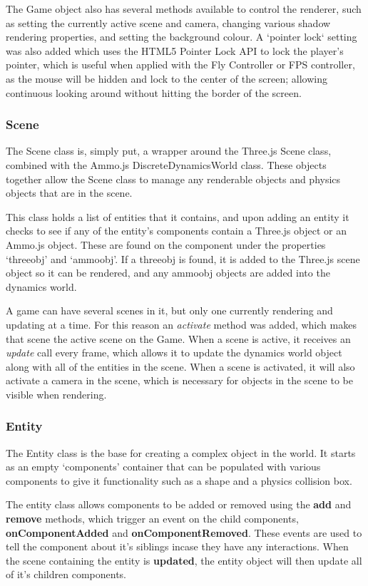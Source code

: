 	The Game object also has several methods available to control the renderer, such as setting the currently active scene and camera, changing various shadow rendering properties, and setting the background colour. A `pointer lock` setting was also added which uses the HTML5 Pointer Lock API to lock the player's pointer, which is useful when applied with the Fly Controller or FPS controller, as the mouse will be hidden and lock to the center of the screen; allowing continuous looking around without hitting the border of the screen.


	\subsubsection{Scene}
	The Scene class is, simply put, a wrapper around the Three.js Scene class, combined with the Ammo.js DiscreteDynamicsWorld class. These objects together allow the Scene class to manage any renderable objects and physics objects that are in the scene.

	This class holds a list of entities that it contains, and upon adding an entity it checks to see if any of the entity's components contain a Three.js object or an Ammo.js object. These are found on the component under the properties `threeobj' and `ammoobj'. If a threeobj is found, it is added to the Three.js scene object so it can be rendered, and any ammoobj objects are added into the dynamics world.

	A game can have several scenes in it, but only one currently rendering and updating at a time. For this reason an \emph{activate} method was added, which makes that scene the active scene on the Game. When a scene is active, it receives an \emph{update} call every frame, which allows it to update the dynamics world object along with all of the entities in the scene. When a scene is activated, it will also activate a camera in the scene, which is necessary for objects in the scene to be visible when rendering.

	\subsubsection{Entity}
	The Entity class is the base for creating a complex object in the world. It starts as an empty `components' container that can be populated with various components to give it functionality such as a shape and a physics collision box. 

	The entity class allows components to be added or removed using the \textbf{add} and \textbf{remove} methods, which trigger an event on the child components, \textbf{onComponentAdded} and \textbf{onComponentRemoved}. These events are used to tell the component about it's siblings incase they have any interactions. When the scene containing the entity is \textbf{updated}, the entity object will then update all of it's children components.

